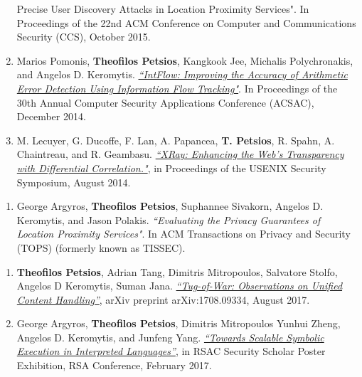 \begin{cvparagraph}
\begin{enumerate}[label=C\arabic*]
{{        Precise User Discovery Attacks in Location Proximity Services"}}. In
        Proceedings of the 22nd ACM Conference on Computer and Communications
        Security (CCS), October 2015.\label{itm:istalker}
    \item Marios Pomonis, \textbf{Theofilos Petsios}, Kangkook Jee, Michalis
        Polychronakis, and Angelos D. Keromytis. \href{http://www.cs.columbia.edu/~theofilos/files/papers/2014/intflow.pdf}{\textit{``IntFlow: Improving
        the Accuracy of Arithmetic Error Detection Using Information Flow
        Tracking"}}. In Proceedings of the 30th Annual Computer Security
        Applications Conference (ACSAC), December 2014.\label{itm:intflow}
    \item M. Lecuyer, G. Ducoffe, F. Lan, A. Papancea, \textbf{T. Petsios}, R.
        Spahn, A. Chaintreau, and R. Geambasu. \href{http://www.cs.columbia.edu/~theofilos/files/papers/2014/xray.pdf}{\textit{``XRay: Enhancing the
        Web's Transparency with Differential Correlation."}}, in Proceedings of
        the USENIX Security Symposium, August 2014.\label{itm:xray}
\end{enumerate}
\end{cvparagraph}

\begin{cvparagraph}
\begin{enumerate}[label=J\arabic*]
    \item George Argyros, \textbf{Theofilos Petsios}, Suphannee Sivakorn,
        Angelos D. Keromytis, and Jason Polakis. \textit{``Evaluating the
        Privacy Guarantees of Location Proximity Services"}. In ACM
        Transactions on Privacy and Security (TOPS) (formerly known as
        TISSEC).\label{itm:istalker_tops}
\end{enumerate}
\end{cvparagraph}

\begin{cvparagraph}
\begin{enumerate}[label=O\arabic*]
    \item \textbf{Theofilos Petsios}, Adrian Tang, Dimitris Mitropoulos, Salvatore Stolfo, Angelos D Keromytis, Suman Jana. \href{https://arxiv.org/pdf/1708.09334.pdf}{\textit{``Tug-of-War: Observations on Unified Content Handling''}}, arXiv preprint arXiv:1708.09334, August 2017.
    \item George Argyros, \textbf{Theofilos Petsios}, Dimitris Mitropoulos
        Yunhui Zheng, Angelos D. Keromytis, and Junfeng Yang.
        \href{https://www.rsaconference.com/writable/files/About/towards_scalable_symbolic_execution_in_interpreted_languages.pdf}{\textit{``Towards Scalable Symbolic Execution in Interpreted Languages''}}, in RSAC Security Scholar Poster Exhibition, RSA Conference, February 2017.
        \label{itm:poster_arpegio}
\end{enumerate}
\end{cvparagraph}
